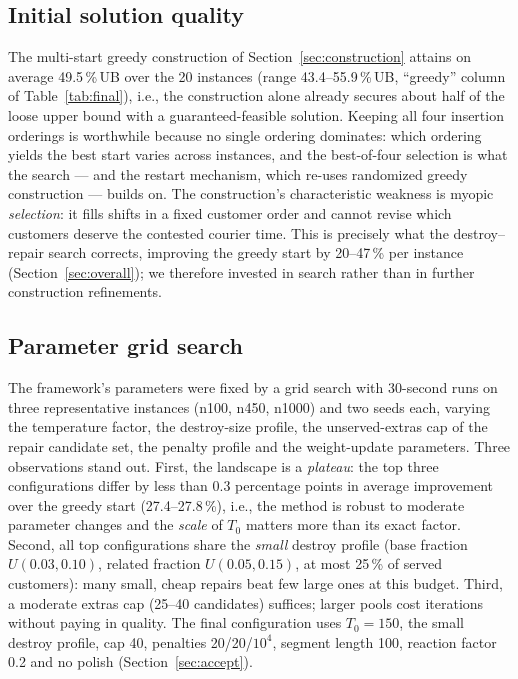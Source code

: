 \documentclass[10pt, a4paper]{article}
\newcommand{\ub}{\%\,UB}
\begin{document}
\subsection{Initial solution quality}\label{sec:exp-greedy}
The multi-start greedy construction of Section~\ref{sec:construction}
attains on average 49.5\,\ub{} over the 20 instances (range
43.4--55.9\,\ub, ``greedy'' column of Table~\ref{tab:final}), i.e., the
construction alone already secures about half of the loose upper bound with
a guaranteed-feasible solution. Keeping all four insertion orderings is
worthwhile because no single ordering dominates: which ordering yields the
best start varies across instances, and the best-of-four selection is what
the search --- and the restart mechanism, which re-uses randomized greedy
construction --- builds on. The construction's characteristic weakness is
myopic \emph{selection}: it fills shifts in a fixed customer order and
cannot revise which customers deserve the contested courier time. This is
precisely what the destroy--repair search corrects, improving the greedy
start by 20--47\,\% per instance (Section~\ref{sec:overall}); we therefore
invested in search rather than in further construction refinements.

\subsection{Parameter grid search}\label{sec:exp-grid}
The framework's parameters were fixed by a grid search with 30-second runs
on three representative instances (n100, n450, n1000) and two seeds each,
varying the temperature factor, the destroy-size profile, the
unserved-extras cap of the repair candidate set, the penalty profile and the
weight-update parameters. Three observations stand out. First, the
landscape is a \emph{plateau}: the top three configurations differ by less
than 0.3 percentage points in average improvement over the greedy start
(27.4--27.8\,\%), i.e., the method is robust to moderate parameter changes
and the \emph{scale} of $T_0$ matters more than its exact factor. Second,
all top configurations share the \emph{small} destroy profile (base
fraction $U(0.03,0.10)$, related fraction $U(0.05,0.15)$, at most 25\,\% of
served customers): many small, cheap repairs beat few large ones at this
budget. Third, a moderate extras cap (25--40 candidates) suffices; larger
pools cost iterations without paying in quality. The final configuration
uses $T_0=150$, the small destroy profile, cap 40, penalties 20/20/$10^4$,
segment length 100, reaction factor 0.2 and no polish
(Section~\ref{sec:accept}).
\end{document}
